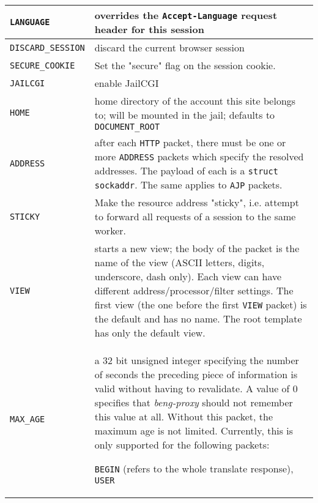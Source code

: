 \documentclass[a4paper,12pt]{article}
\begin{document}
\begin{longtable}{|l|p{8cm}|}
\hline

\verb|LANGUAGE| & overrides the \texttt{Accept-Language} request
header for this session \\
\hline

\verb|DISCARD_SESSION| & discard the current browser session \\

\hline

\verb|SECURE_COOKIE| & Set the "secure" flag on the session cookie. \\

\hline

\verb|JAILCGI| & enable JailCGI \\

\hline

\verb|HOME| & home directory of the account this site belongs to;
will be mounted in the jail; defaults to \verb|DOCUMENT_ROOT| \\

\hline

\verb|ADDRESS| & after each \verb|HTTP| packet, there must be one
or more \verb|ADDRESS| packets which specify the resolved addresses.
The payload of each is a \texttt{struct sockaddr}.
The same applies to \verb|AJP| packets. \\

\hline

\verb|STICKY| & Make the resource address "sticky", i.e. attempt to
forward all requests of a session to the same worker. \\

\hline

\verb|VIEW| & starts a new view; the body of the packet is the name
of the view (ASCII letters, digits, underscore, dash only).  Each view
can have different address/processor/filter settings.  The first view
(the one before the first \verb|VIEW| packet) is the default and has
no name.  The root template has only the default view. \\

\hline

\verb|MAX_AGE| & a 32 bit unsigned integer specifying the number of
seconds the preceding piece of information is valid without having to
revalidate.  A value of 0 specifies that \emph{beng-proxy} should not
remember this value at all.  Without this packet, the maximum age is
not limited.  Currently, this is only supported for the following
packets:

\verb|BEGIN| (refers to the whole translate response), \verb|USER|
\\


\end{longtable}
\end{document}
